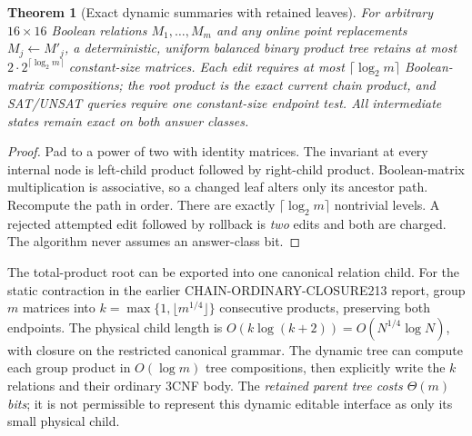 \documentclass[11pt]{article}
\newtheorem{theorem}{Theorem}
\begin{document}
\begin{theorem}[Exact dynamic summaries with retained leaves]\label{thm:positive}
For arbitrary $16\times16$ Boolean relations $M_1,\ldots,M_m$ and any online point replacements $M_j\gets M'_j$, a deterministic, uniform balanced binary product tree retains at most $2\cdot 2^{\lceil\log_2m\rceil}$ constant-size matrices. Each edit requires at most $\lceil\log_2m\rceil$ Boolean-matrix compositions; the root product is the exact current chain product, and SAT/UNSAT queries require one constant-size endpoint test. All intermediate states remain exact on both answer classes.
\end{theorem}
\begin{proof}
Pad to a power of two with identity matrices. The invariant at every internal node is left-child product followed by right-child product. Boolean-matrix multiplication is associative, so a changed leaf alters only its ancestor path. Recompute the path in order. There are exactly $\lceil\log_2m\rceil$ nontrivial levels. A rejected attempted edit followed by rollback is \emph{two} edits and both are charged. The algorithm never assumes an answer-class bit.
\end{proof}

The total-product root can be exported into one canonical relation child. For the static contraction in the earlier CHAIN-ORDINARY-CLOSURE213 report, group $m$ matrices into $k=\max\{1,\lfloor m^{1/4}\rfloor\}$ consecutive products, preserving both endpoints. The physical child length is $O(k\log(k+2))=O(N^{1/4}\log N)$, with closure on the restricted canonical grammar. The dynamic tree can compute each group product in $O(\log m)$ tree compositions, then explicitly write the $k$ relations and their ordinary 3CNF body. The \emph{retained parent tree costs $\Theta(m)$ bits}; it is not permissible to represent this dynamic editable interface as only its small physical child.
\end{document}
